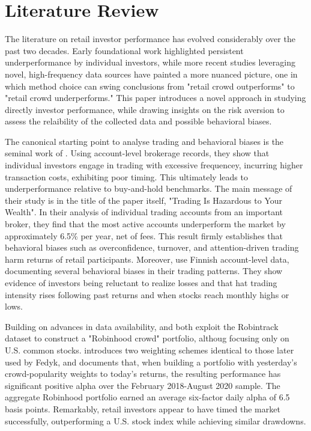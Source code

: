 \section{Literature Review}

The literature on retail investor performance has evolved considerably over the past two decades. 
Early foundational work highlighted persistent underperformance by individual investors, while more recent studies leveraging novel, high-frequency data sources have painted a more nuanced picture, one in which method choice can swing conclusions from "retail crowd outperforms" to "retail crowd underperforms."
This paper introduces a novel approach in studying directly investor performance, while drawing insights on the risk aversion to assess the relaibility of the collected data and possible behavioral biases.

The canonical starting point to analyse trading and behavioral biases is the seminal work of \cite{BarberOdean2000}. 
Using account-level brokerage records, they show that individual investors engage in trading with excessive frequencey, incurring higher transaction costs, 
exhibiting poor timing. This ultimately leads to underperformance relative to buy-and-hold benchmarks.
The main message of their study is in the title of the paper itself, "Trading Is Hazardous to Your Wealth".  
In their analysis of individual trading accounts from an important broker, they find that the most active accounts underperform the market by approximately 6.5\% per year, net of fees. 
This result firmly establishes that behavioral biases such as overconfidence, turnover, and attention-driven trading harm returns of retail participants.
Moreover, \cite{Grinblatt2001} use Finnish account-level data, documenting several behavioral biases in  their trading patterns.
They show evidence of investors being reluctant to realize losses and that hat trading intensity rises following past returns and when stocks reach monthly highs or lows.

Building on advances in data availability, \cite{Welch2022} and \cite{Fedyk2024} both exploit the Robintrack dataset to construct a "Robinhood crowd" portfolio, 
althoug focusing only on U.S. common stocks.
\cite{Welch2022} introduces two weighting schemes identical to those later used by Fedyk, and documents that, when building a portfolio with yesterday's crowd-popularity weights to today's returns, the resulting performance has significant positive alpha over the February 2018-August 2020 sample. 
The aggregate Robinhood portfolio earned an average six-factor daily alpha of 6.5 basis points.
Remarkably, retail investors appear to have timed the market successfully, outperforming a U.S. stock index while achieving similar drawdowns.

